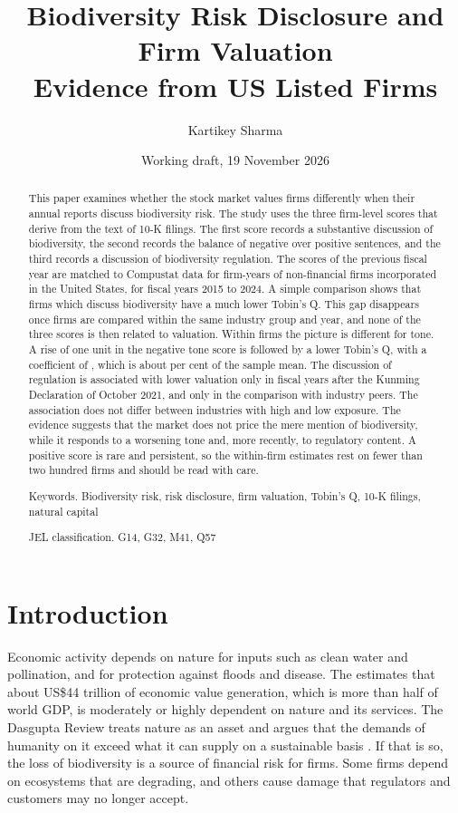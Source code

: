 \documentclass[12pt,a4paper]{article}
\title{Biodiversity Risk Disclosure and Firm Valuation\\[4pt] \large Evidence from US Listed Firms}
\author{Kartikey Sharma}
\date{Working draft, 19 November 2026}
\begin{document}
\maketitle

\begin{abstract}
\noindent This paper examines whether the stock market values firms differently when their annual reports discuss biodiversity risk. The study uses the three firm-level scores that \citet{giglio2026} derive from the text of 10-K filings. The first score records a substantive discussion of biodiversity, the second records the balance of negative over positive sentences, and the third records a discussion of biodiversity regulation. The scores of the previous fiscal year are matched to Compustat data for \nFinal{} firm-years of \nFirmsFinal{} non-financial firms incorporated in the United States, for fiscal years 2015 to 2024. A simple comparison shows that firms which discuss biodiversity have a much lower Tobin's Q. This gap disappears once firms are compared within the same industry group and year, and none of the three scores is then related to valuation. Within firms the picture is different for tone. A rise of one unit in the negative tone score is followed by a lower Tobin's Q, with a coefficient of \coefFAllNeg{}, which is about \effNegMean{} per cent of the sample mean. The discussion of regulation is associated with lower valuation only in fiscal years after the Kunming Declaration of October 2021, and only in the comparison with industry peers. The association does not differ between industries with high and low exposure. The evidence suggests that the market does not price the mere mention of biodiversity, while it responds to a worsening tone and, more recently, to regulatory content. A positive score is rare and persistent, so the within-firm estimates rest on fewer than two hundred firms and should be read with care.

\medskip
\noindent Keywords. Biodiversity risk, risk disclosure, firm valuation, Tobin's Q, 10-K filings, natural capital

\noindent JEL classification. G14, G32, M41, Q57
\end{abstract}

\section{Introduction}

Economic activity depends on nature for inputs such as clean water and pollination, and for protection against floods and disease. The \citet{wef2020} estimates that about US\$44 trillion of economic value generation, which is more than half of world GDP, is moderately or highly dependent on nature and its services. The Dasgupta Review treats nature as an asset and argues that the demands of humanity on it exceed what it can supply on a sustainable basis \citep{dasgupta2021}. If that is so, the loss of biodiversity is a source of financial risk for firms. Some firms depend on ecosystems that are degrading, and others cause damage that regulators and customers may no longer accept.
\end{document}
